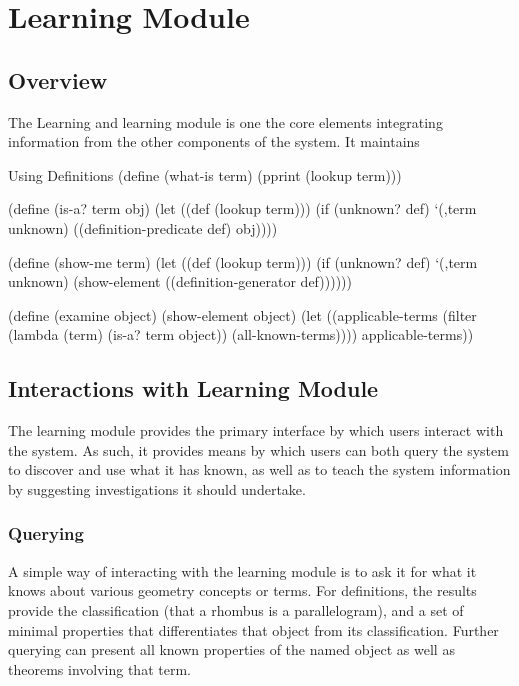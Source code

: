 \chapter{Learning Module}
\label{chap:learning}

\section{Overview}

The Learning and learning module is one the core elements integrating
information from the other components of the system. It maintains

\begin{code-example}{Using Definitions}
(define (what-is term)
  (pprint (lookup term)))

(define (is-a? term obj)
  (let ((def (lookup term)))
    (if (unknown? def)
        `(,term unknown)
        ((definition-predicate def) obj))))

(define (show-me term)
  (let ((def (lookup term)))
    (if (unknown? def)
        `(,term unknown)
        (show-element ((definition-generator def))))))

(define (examine object)
  (show-element object)
  (let ((applicable-terms
         (filter (lambda (term)
                   (is-a? term object))
                 (all-known-terms))))
    applicable-terms))
\end{code-example}

\section{Interactions with Learning Module}

The learning module provides the primary interface by which users
interact with the system. As such, it provides means by which users
can both query the system to discover and use what it has known, as
well as to teach the system information by suggesting investigations
it should undertake.

\subsection{Querying}

A simple way of interacting with the learning module is to ask it for
what it knows about various geometry concepts or terms. For
definitions, the results provide the classification (that a rhombus is
a parallelogram), and a set of minimal properties that differentiates
that object from its classification. Further querying can present all
known properties of the named object as well as theorems involving
that term.

